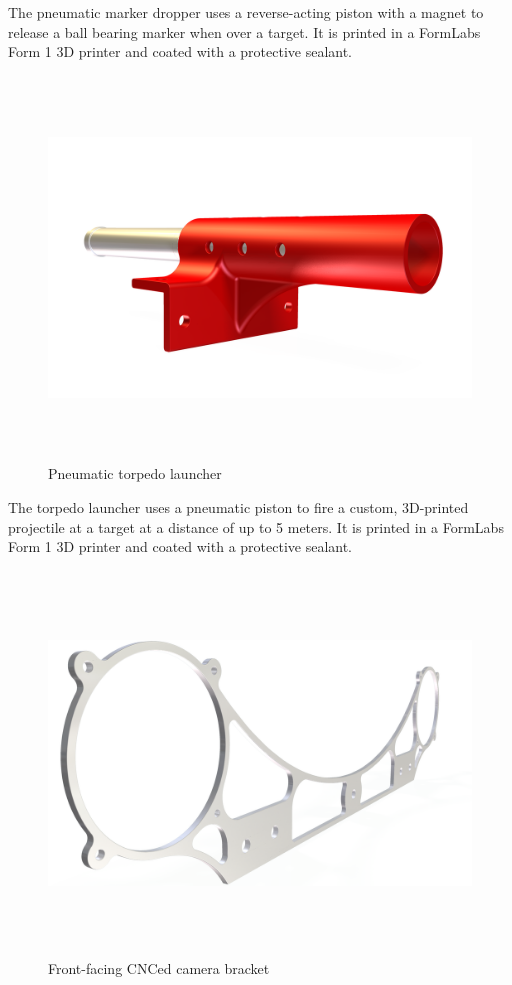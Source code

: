 \documentclass[12pt, landscape]{article}
\begin{document}
	The pneumatic marker dropper uses a reverse-acting piston with a magnet to release a ball bearing marker when over a target.  It is printed in a FormLabs Form 1 3D printer and coated with a protective sealant.

	\begin{figure}[H]
		\centering
		\includegraphics[height=4in]{media/TORPEDO-RENDER-ALPHA.png}
		\caption{Pneumatic torpedo launcher}
		\label{torpedo}
	\end{figure}

	The torpedo launcher uses a pneumatic piston to fire a custom, 3D-printed projectile at a target at a distance of up to 5 meters.  It is printed in a FormLabs Form 1 3D printer and coated with a protective sealant.

	\begin{figure}[H]
		\centering
		\includegraphics[height=4in]{media/front_camera_bracket.png}
		\caption{Front-facing CNCed camera bracket}
		\label{camera_bracket}
	\end{figure}
\end{document}
